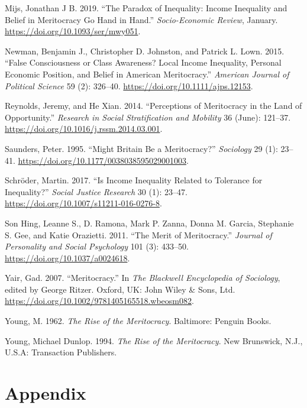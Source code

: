 \documentclass[
]{article}
\begin{document}
\leavevmode\hypertarget{ref-mijs_paradox_2019}{}%
Mijs, Jonathan J B. 2019. ``The Paradox of Inequality: Income Inequality and Belief in Meritocracy Go Hand in Hand.'' \emph{Socio-Economic Review}, January. \url{https://doi.org/10.1093/ser/mwy051}.

\leavevmode\hypertarget{ref-newman_false_2015}{}%
Newman, Benjamin J., Christopher D. Johnston, and Patrick L. Lown. 2015. ``False Consciousness or Class Awareness? Local Income Inequality, Personal Economic Position, and Belief in American Meritocracy.'' \emph{American Journal of Political Science} 59 (2): 326--40. \url{https://doi.org/10.1111/ajps.12153}.

\leavevmode\hypertarget{ref-reynolds_perceptions_2014}{}%
Reynolds, Jeremy, and He Xian. 2014. ``Perceptions of Meritocracy in the Land of Opportunity.'' \emph{Research in Social Stratification and Mobility} 36 (June): 121--37. \url{https://doi.org/10.1016/j.rssm.2014.03.001}.

\leavevmode\hypertarget{ref-saundersMightBritainBe1995}{}%
Saunders, Peter. 1995. ``Might Britain Be a Meritocracy?'' \emph{Sociology} 29 (1): 23--41. \url{https://doi.org/10.1177/0038038595029001003}.

\leavevmode\hypertarget{ref-schroder_Income_2017}{}%
Schröder, Martin. 2017. ``Is Income Inequality Related to Tolerance for Inequality?'' \emph{Social Justice Research} 30 (1): 23--47. \url{https://doi.org/10.1007/s11211-016-0276-8}.

\leavevmode\hypertarget{ref-son_hing_merit_2011-1}{}%
Son Hing, Leanne S., D. Ramona, Mark P. Zanna, Donna M. Garcia, Stephanie S. Gee, and Katie Orazietti. 2011. ``The Merit of Meritocracy.'' \emph{Journal of Personality and Social Psychology} 101 (3): 433--50. \url{https://doi.org/10.1037/a0024618}.

\leavevmode\hypertarget{ref-yairMeritocracy2007}{}%
Yair, Gad. 2007. ``Meritocracy.'' In \emph{The Blackwell Encyclopedia of Sociology}, edited by George Ritzer. Oxford, UK: John Wiley \& Sons, Ltd. \url{https://doi.org/10.1002/9781405165518.wbeosm082}.

\leavevmode\hypertarget{ref-young_rise_1962}{}%
Young, M. 1962. \emph{The Rise of the Meritocracy}. Baltimore: Penguin Books.

\leavevmode\hypertarget{ref-youngRiseMeritocracy1994}{}%
Young, Michael Dunlop. 1994. \emph{The Rise of the Meritocracy}. New Brunswick, N.J., U.S.A: Transaction Publishers.

\hypertarget{appendix}{%
\section*{Appendix}\label{appendix}}
\end{document}
